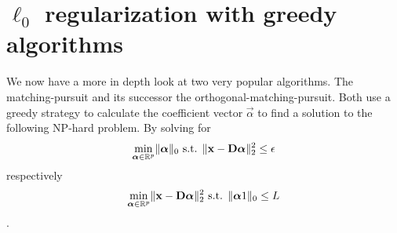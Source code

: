


\section{$\ell_0$ regularization with greedy algorithms}
We now have a more in depth look at two very popular algorithms. 
The matching-pursuit and its successor the orthogonal-matching-pursuit.
Both use a greedy strategy to calculate the coefficient vector $\vec{\alpha}$ to
find
a solution to the following NP-hard problem. By solving for
\begin{equation*}
\min_{\boldsymbol{\mathrm{\alpha}}\in\mathbb{R}^{p}}   \lVert \boldsymbol{\mathrm{\alpha}} \rVert_{0}   \textrm{
s.t. }
\lVert \boldsymbol{\mathrm{x}} - \boldsymbol{\mathrm{D}}\boldsymbol{\mathrm{\alpha}} \rVert^{2}_{2} \leq \epsilon
\end{equation*}
respectively
\begin{equation*}
\min_{\boldsymbol{\mathrm{\alpha}}\in\mathbb{R}^{p}}  \lVert \boldsymbol{\mathrm{x}} - \boldsymbol{\mathrm{D}}\boldsymbol{\mathrm{\alpha}}
\rVert^{2}_{2} \textrm{ s.t.
} \lVert \boldsymbol{\mathrm{\alpha}}	1 \rVert_{0} \leq L
\end{equation*}.

